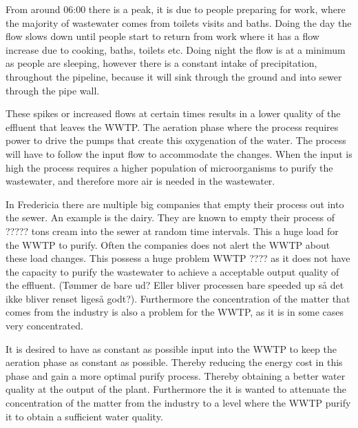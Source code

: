 From around 06:00 there is a peak, it is due to people preparing for work, where the majority of wastewater comes from toilets visits and baths. Doing the day the flow slows down until people start to return from work where it has a flow increase due to cooking, baths, toilets etc. Doing night the flow is at a minimum as people are sleeping, however there is a constant intake of precipitation, throughout the pipeline, because it will sink through the ground and into sewer through the pipe wall.  

These spikes or increased flows at certain times results in a lower quality of the effluent that leaves the WWTP. The aeration phase where the process requires power to drive the pumps that create this oxygenation of the water. The process will have to follow the input flow to accommodate the changes. When the input is high the process requires a higher population of microorganisms to purify the wastewater, and therefore more air is needed in the wastewater. 

In Fredericia there are multiple big companies that empty their process out into the sewer. An example is the dairy. They are known to empty their process of ????? tons cream into the sewer at random time intervals. This a huge load for the WWTP to purify. Often the companies does not alert the WWTP about these load changes. This possess a huge problem WWTP ???? as it does not have the capacity to purify the wastewater to achieve a acceptable output quality of the effluent. (Tømmer de bare ud? Eller bliver processen bare speeded up så det ikke bliver renset ligeså godt?). Furthermore the concentration of the matter that comes from the industry is also a problem for the WWTP, as it is in some cases very concentrated.  

It is desired to have as constant as possible input into the WWTP to keep the aeration phase as constant as possible. Thereby reducing the energy cost in this phase and gain a more optimal purify process. Thereby obtaining a better water quality at the output of the plant. Furthermore the it is wanted to attenuate the concentration of the matter from the industry to a level where the WWTP purify it to obtain a sufficient water quality. 







